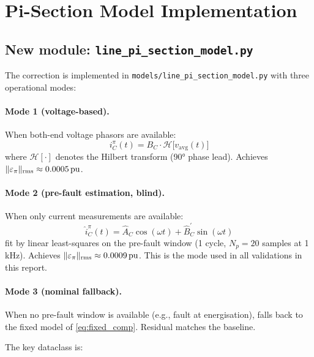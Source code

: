 \documentclass[11pt,a4paper]{article}
\newcommand{\BC}{B_C}
\newcommand{\eps}{\varepsilon}
\newcommand{\pu}{\,\text{pu}}
\begin{document}
\section{Pi-Section Model Implementation}
\label{sec:implementation}

\subsection{New module: \texttt{line\_pi\_section\_model.py}}

The correction is implemented in
\texttt{models/line\_pi\_section\_model.py} with three operational modes:

\paragraph{Mode 1 (voltage-based).}
When both-end voltage phasors are available:
\begin{equation}
  i_C^{\pi}(t) = \BC\cdot\mathcal{H}\!\bigl[v_{\mathrm{avg}}(t)\bigr]
  \label{eq:voltage_correction}
\end{equation}
where $\mathcal{H}[\cdot]$ denotes the Hilbert transform (90° phase lead).
Achieves $\|\eps_{\pi}\|_{\rm rms} \approx 0.0005\pu$.

\paragraph{Mode 2 (pre-fault estimation, blind).}
When only current measurements are available:
\begin{equation}
  \hat{i}_C^{\pi}(t) = \hat{A}_C \cos(\omega t) + \hat{B}_C^{\prime} \sin(\omega t)
  \label{eq:blind_correction}
\end{equation}
fit by linear least-squares on the pre-fault window (1 cycle, $N_p = 20$ samples
at 1\,kHz).  Achieves $\|\eps_{\pi}\|_{\rm rms} \approx 0.0009\pu$.
This is the mode used in all validations in this report.

\paragraph{Mode 3 (nominal fallback).}
When no pre-fault window is available (e.g., fault at energisation), falls back
to the fixed model of \eqref{eq:fixed_comp}.  Residual matches the baseline.

The key dataclass is:
\end{document}
